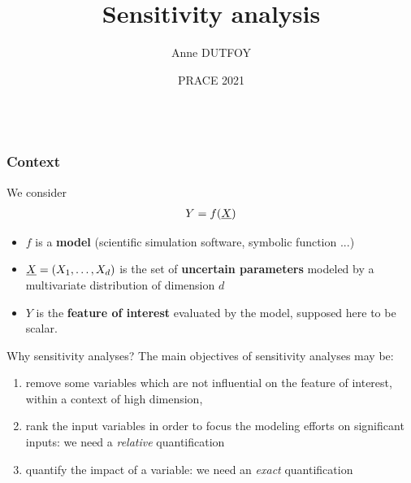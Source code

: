 \documentclass[8pt]{beamer}
\title[Sensitivity analysis]{Sensitivity analysis}
\author[Anne Dutfoy]{
 Anne DUTFOY
}
\institute[]{
 EDF R\&D PERICLES. \\
 anne.dutfoy@edf.Fr
}
\date[PRACE 2021]{PRACE 2021}
\begin{document}

\begin{frame}[plain]
  \begin{columns}
    \titlepage
    \vfill
  \end{columns}
\end{frame}






\begin{frame}
  \frametitle{Context}
\small
We consider
\alert{
\begin{align*}
 Y=f({\underline{X}})
\end{align*}
}
\begin{itemize}
  \item $f$ is a {\bf model} (scientific simulation software, symbolic function ...)
  \item ${\underline{X}}=(X_1, \dots, X_d)$ is the set of  {\bf uncertain parameters } modeled by a multivariate distribution of dimension $d$
  \item $Y$ is the {\bf feature of interest} evaluated by the model, supposed here to be scalar.
\end{itemize}

  \begin{block}{Why sensitivity analyses?}
  The main objectives of sensitivity analyses may be:
\begin{enumerate}
 \item \alert{remove some variables} which are not influential on the feature of interest, within a context of high dimension,
 \item\alert{ rank the input variables } in order to focus the modeling efforts on significant inputs: we need a  \emph{relative} quantification
 \item \alert{quantify the impact of a variable}: we need an \emph{exact} quantification
\end{enumerate}
\end{block}
\end{frame}
\end{document}
